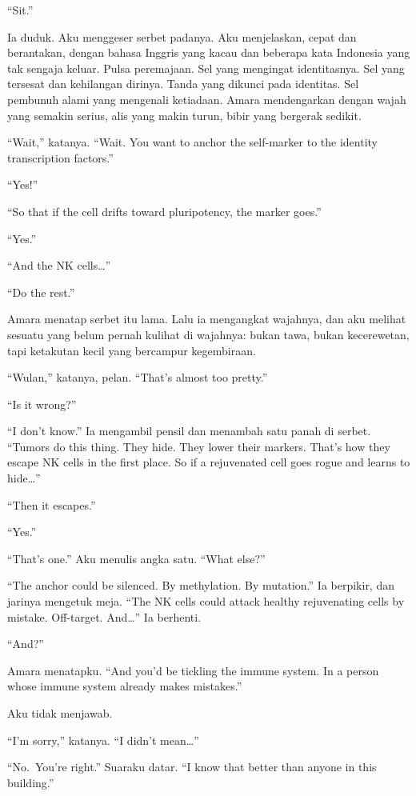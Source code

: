 \documentclass[11pt,twoside,openany]{book}
\begin{document}
``Sit.''

Ia duduk. Aku menggeser serbet padanya. Aku menjelaskan, cepat dan berantakan, dengan bahasa Inggris yang kacau dan beberapa kata Indonesia yang tak sengaja keluar. Pulsa peremajaan. Sel yang mengingat identitasnya. Sel yang tersesat dan kehilangan dirinya. Tanda yang dikunci pada identitas. Sel pembunuh alami yang mengenali ketiadaan. Amara mendengarkan dengan wajah yang semakin serius, alis yang makin turun, bibir yang bergerak sedikit.

``Wait,'' katanya. ``Wait. You want to anchor the self-marker to the identity transcription factors.''

``Yes!''

``So that if the cell drifts toward pluripotency, the marker goes.''

``Yes.''

``And the NK cells\ldots{}''

``Do the rest.''

Amara menatap serbet itu lama. Lalu ia mengangkat wajahnya, dan aku melihat sesuatu yang belum pernah kulihat di wajahnya: bukan tawa, bukan kecerewetan, tapi ketakutan kecil yang bercampur kegembiraan.

``Wulan,'' katanya, pelan. ``That's almost too pretty.''

``Is it wrong?''

``I don't know.'' Ia mengambil pensil dan menambah satu panah di serbet. ``Tumors do this thing. They hide. They lower their markers. That's how they escape NK cells in the first place. So if a rejuvenated cell goes rogue and learns to hide\ldots{}''

``Then it escapes.''

``Yes.''

``That's one.'' Aku menulis angka satu. ``What else?''

``The anchor could be silenced. By methylation. By mutation.'' Ia berpikir, dan jarinya mengetuk meja. ``The NK cells could attack healthy rejuvenating cells by mistake. Off-target. And\ldots{}'' Ia berhenti.

``And?''

Amara menatapku. ``And you'd be tickling the immune system. In a person whose immune system already makes mistakes.''

Aku tidak menjawab.

``I'm sorry,'' katanya. ``I didn't mean\ldots{}''

``No.~You're right.'' Suaraku datar. ``I know that better than anyone in this building.''
\end{document}
